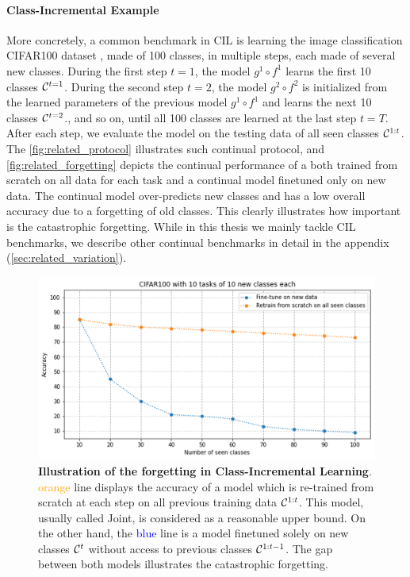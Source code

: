 \paragraph{Class-Incremental Example} More concretely, a common benchmark in \acf{CIL} is learning
the image classification CIFAR100 dataset \citep{krizhevskycifar100}, made of 100 classes, in
multiple steps, each made of several new classes. During the first step $t=1$, the model $g^1 \circ
      f^1$ learns the first 10 classes $\mathcal{C}^{t=1}$. During the second step $t=2$, the model $g^2 \circ
      f^2$ is initialized from the learned parameters of the previous model $g^1 \circ f^1$ and learns the
next 10 classes $\mathcal{C}^{t=2}$., and so on, until all 100 classes are learned at the last step $t=T$.
After each step, we evaluate the model on the testing data of all seen classes $\mathcal{C}^{1:t}$. The
\autoref{fig:related_protocol} illustrates such continual protocol, and
\autoref{fig:related_forgetting} depicts the continual performance of a both trained from scratch on
all data for each task and a continual model finetuned only on new data. The continual model
over-predicts new classes \citep{davidson2020masteryincremental} and has a low overall accuracy due
to a forgetting of old classes. This clearly illustrates how important is the catastrophic
forgetting. While in this thesis we mainly tackle \acf{CIL} benchmarks, we describe other continual
benchmarks in detail in the appendix (\autoref{sec:related_variation}).

\begin{figure}[tb]
      \begin{center}
            \includegraphics[width=0.8\linewidth]{images/related/catastrophic_forgetting.png}
      \end{center}
      \caption{\textbf{Illustration of the forgetting in Class-Incremental Learning}.
            \textcolor{orange}{orange} line displays the accuracy of a model which is re-trained from
            scratch at each step on all previous training data $\mathcal{C}^{1:t}$. This model, usually called
            Joint, is considered as a reasonable upper bound. On the other hand, the
            \textcolor{blue}{blue} line is a model finetuned solely on new classes $\mathcal{C}^{t}$ without
            access to previous classes $\mathcal{C}^{1:t-1}$. The gap between both models illustrates the
            catastrophic forgetting.}
      \label{fig:related_forgetting}
\end{figure}

